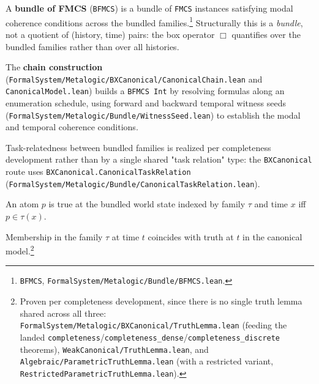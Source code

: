 \documentclass[../BimodalReference.tex]{subfiles}
\begin{document}
\begin{definition}
A \textbf{bundle of FMCS} (\texttt{BFMCS}) is a bundle of \texttt{FMCS} instances satisfying modal coherence conditions across the bundled families.\footnote{\texttt{BFMCS}, \texttt{FormalSystem/Metalogic/Bundle/BFMCS.lean}.}
Structurally this is a \emph{bundle}, not a quotient of (history, time) pairs: the box operator $\Box$ quantifies over the bundled families rather than over all histories.
\end{definition}


The \textbf{chain construction} (\texttt{FormalSystem/Metalogic/BXCanonical/CanonicalChain.lean}
and \texttt{CanonicalModel.lean}) builds a \texttt{BFMCS Int} by resolving formulas along an
enumeration schedule, using forward and backward temporal witness seeds
(\texttt{FormalSystem/Metalogic/Bundle/WitnessSeed.lean}) to establish the modal and temporal
coherence conditions.

Task-relatedness between bundled families is realized per completeness development rather than
by a single shared "task relation" type: the \texttt{BXCanonical} route uses
\texttt{BXCanonical.CanonicalTaskRelation} (\texttt{FormalSystem/Metalogic/Bundle/CanonicalTaskRelation.lean}).

\begin{definition}
An atom $p$ is true at the bundled world state indexed by family $\tau$ and time $x$ iff $p \in \tau(x)$.
\end{definition}

\begin{lemma}
Membership in the family $\tau$ at time $t$ coincides with truth at $t$ in the canonical model.\footnote{Proven per completeness development, since there is no single truth lemma shared across all three: \texttt{FormalSystem/Metalogic/BXCanonical/TruthLemma.lean} (feeding the landed \texttt{completeness}/\texttt{completeness\_dense}/\texttt{completeness\_discrete} theorems), \texttt{WeakCanonical/TruthLemma.lean}, and \texttt{Algebraic/ParametricTruthLemma.lean} (with a restricted variant, \texttt{RestrictedParametricTruthLemma.lean}).}
\end{lemma}
\end{document}
